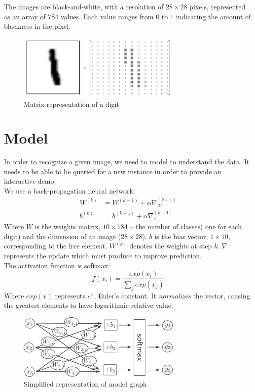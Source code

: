 \documentclass[a4paper]{article}
\begin{document}
The images are black-and-white, with a resolution of $28 \times 28$ pixels, represented as an array of $784$ values. Each value ranges from $0$ to $1$ indicating the amount of blackness in the pixel.

\begin{figure}[htb]
\centering
\includegraphics[width=8cm]{images/mnist-matrix.png}
\caption{Matrix representation of a digit \cite{tf}}
\end{figure}


\newpage
\section{Model}
\label{sec:model}
In order to recognize a given image, we need to model to understand the data. It needs to be able to be queried for a new instance in order to provide an interactive demo.
\\

We use a back-propagation neural network:
\begin{align*}
W^{(k)} &= W^{(k-1)} + \alpha \nabla_W^{(k-1)} \\ 
b^{(k)} &= b^{(k-1)} + \alpha \nabla_b^{(k-1)}
\end{align*}
Where $W$ is the weights matrix, $10 \times 784$ -- the number of classes( one for each digit) and the dimension of an image ($28 \times 28$). $b$ is the bias vector, $1 \times 10$, corresponding to the free element. $W^{(k)}$ denotes the weights at step $k$. $\nabla$ represents the update which must produce to improve prediction.
\\

The activation function is softmax:
$$f(x_i)=\frac{exp(x_i)}{\sum_j exp(x_j)}$$
Where $exp(x)$ represents $e^x$, Euler's constant. It \textit{normalizes} the vector, causing the greatest elements to have logarithmic relative value.
\\

\begin{figure}[htb]
\centering
\includegraphics[width=8cm]{images/model-graph.png}
\caption{Simplified representation of model graph \cite{tf}}
\end{figure}
\end{document}
